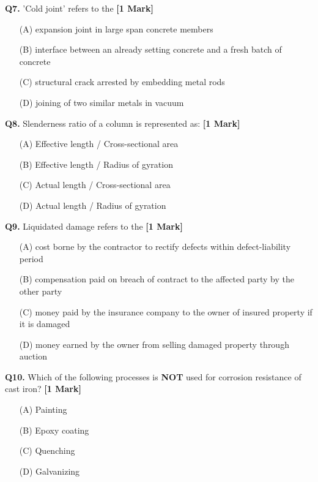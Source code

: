 \documentclass[11pt]{article}
\newcommand{\questiona}[2]{
    \noindent\textbf{Q#2.} #1 \hfill \textbf{[1 Mark]}
}
\begin{document}
\questiona{'Cold joint' refers to the}{7}
\begin{enumerate}
    \item[(A)] expansion joint in large span concrete members
    \item[(B)] interface between an already setting concrete and a fresh batch of concrete  
    \item[(C)] structural crack arrested by embedding metal rods
    \item[(D)] joining of two similar metals in vacuum
\end{enumerate}

\vspace{0.5cm}

\questiona{Slenderness ratio of a column is represented as:}{8}
\begin{enumerate}
    \item[(A)] Effective length / Cross-sectional area
    \item[(B)] Effective length / Radius of gyration  
    \item[(C)] Actual length / Cross-sectional area
    \item[(D)] Actual length / Radius of gyration
\end{enumerate}

\vspace{0.5cm}

\questiona{Liquidated damage refers to the}{9}
\begin{enumerate}
    \item[(A)] cost borne by the contractor to rectify defects within defect-liability period
    \item[(B)] compensation paid on breach of contract to the affected party by the other party  
    \item[(C)] money paid by the insurance company to the owner of insured property if it is damaged
    \item[(D)] money earned by the owner from selling damaged property through auction
\end{enumerate}

\vspace{0.5cm}

\questiona{Which of the following processes is \textbf{NOT} used for corrosion resistance of cast iron?}{10}
\begin{enumerate}
    \item[(A)] Painting
    \item[(B)] Epoxy coating  
    \item[(C)] Quenching
    \item[(D)] Galvanizing
\end{enumerate}
\end{document}
